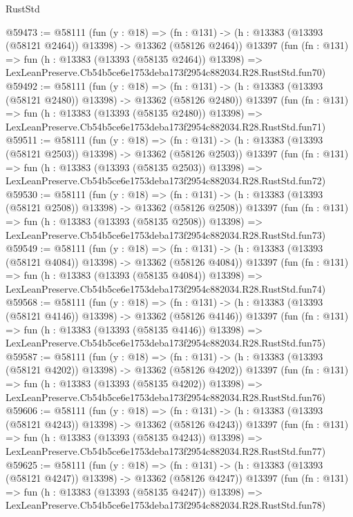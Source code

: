 \begin{lexlean}{RustStd}
\begin{coremodule}
@59473 := @58111
    (fun (y : @18) =>
    (fn : @131) -> (h : @13383 (@13393 (@58121 @2464)) @13398) -> @13362 (@58126 @2464))
    @13397
    (fun (fn : @131) =>
    fun (h : @13383 (@13393 (@58135 @2464)) @13398) =>
    LexLeanPreserve.Cb54b5ce6e1753deba173f2954c882034.R28.RustStd.fun70)
@59492 := @58111
    (fun (y : @18) =>
    (fn : @131) -> (h : @13383 (@13393 (@58121 @2480)) @13398) -> @13362 (@58126 @2480))
    @13397
    (fun (fn : @131) =>
    fun (h : @13383 (@13393 (@58135 @2480)) @13398) =>
    LexLeanPreserve.Cb54b5ce6e1753deba173f2954c882034.R28.RustStd.fun71)
@59511 := @58111
    (fun (y : @18) =>
    (fn : @131) -> (h : @13383 (@13393 (@58121 @2503)) @13398) -> @13362 (@58126 @2503))
    @13397
    (fun (fn : @131) =>
    fun (h : @13383 (@13393 (@58135 @2503)) @13398) =>
    LexLeanPreserve.Cb54b5ce6e1753deba173f2954c882034.R28.RustStd.fun72)
@59530 := @58111
    (fun (y : @18) =>
    (fn : @131) -> (h : @13383 (@13393 (@58121 @2508)) @13398) -> @13362 (@58126 @2508))
    @13397
    (fun (fn : @131) =>
    fun (h : @13383 (@13393 (@58135 @2508)) @13398) =>
    LexLeanPreserve.Cb54b5ce6e1753deba173f2954c882034.R28.RustStd.fun73)
@59549 := @58111
    (fun (y : @18) =>
    (fn : @131) -> (h : @13383 (@13393 (@58121 @4084)) @13398) -> @13362 (@58126 @4084))
    @13397
    (fun (fn : @131) =>
    fun (h : @13383 (@13393 (@58135 @4084)) @13398) =>
    LexLeanPreserve.Cb54b5ce6e1753deba173f2954c882034.R28.RustStd.fun74)
@59568 := @58111
    (fun (y : @18) =>
    (fn : @131) -> (h : @13383 (@13393 (@58121 @4146)) @13398) -> @13362 (@58126 @4146))
    @13397
    (fun (fn : @131) =>
    fun (h : @13383 (@13393 (@58135 @4146)) @13398) =>
    LexLeanPreserve.Cb54b5ce6e1753deba173f2954c882034.R28.RustStd.fun75)
@59587 := @58111
    (fun (y : @18) =>
    (fn : @131) -> (h : @13383 (@13393 (@58121 @4202)) @13398) -> @13362 (@58126 @4202))
    @13397
    (fun (fn : @131) =>
    fun (h : @13383 (@13393 (@58135 @4202)) @13398) =>
    LexLeanPreserve.Cb54b5ce6e1753deba173f2954c882034.R28.RustStd.fun76)
@59606 := @58111
    (fun (y : @18) =>
    (fn : @131) -> (h : @13383 (@13393 (@58121 @4243)) @13398) -> @13362 (@58126 @4243))
    @13397
    (fun (fn : @131) =>
    fun (h : @13383 (@13393 (@58135 @4243)) @13398) =>
    LexLeanPreserve.Cb54b5ce6e1753deba173f2954c882034.R28.RustStd.fun77)
@59625 := @58111
    (fun (y : @18) =>
    (fn : @131) -> (h : @13383 (@13393 (@58121 @4247)) @13398) -> @13362 (@58126 @4247))
    @13397
    (fun (fn : @131) =>
    fun (h : @13383 (@13393 (@58135 @4247)) @13398) =>
    LexLeanPreserve.Cb54b5ce6e1753deba173f2954c882034.R28.RustStd.fun78)

\end{coremodule}
\end{lexlean}
